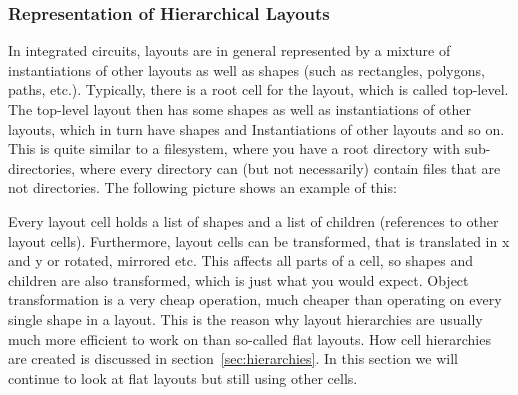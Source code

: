 \subsubsection{Representation of Hierarchical Layouts}
In integrated circuits, layouts are in general represented by a mixture of instantiations of other layouts as well as shapes (such as rectangles,
polygons, paths, etc.).
Typically, there is a root cell for the layout, which is called top-level.
The top-level layout then has some shapes as well as instantiations of other layouts, which in turn have shapes and Instantiations of other layouts and so on.
This is quite similar to a filesystem, where you have a root directory with sub-directories, where every directory can (but not necessarily) contain files that are not directories.
The following picture shows an example of this:
\begin{center}
\end{center}
Every layout cell holds a list of shapes and a list of children (references to other layout cells).
Furthermore, layout cells can be transformed, that is translated in x and y or rotated, mirrored etc.
This affects all parts of a cell, so shapes and children are also transformed, which is just what you would expect.
Object transformation is a very cheap operation, much cheaper than operating on every single shape in a layout.
This is the reason why layout hierarchies are usually much more efficient to work on than so-called flat layouts.
How cell hierarchies are created is discussed in section~\ref{sec:hierarchies}.
In this section we will continue to look at flat layouts but still using other cells.

